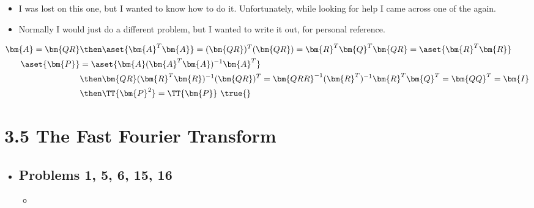 \begin{itemize}
\begin{enumerate}
    \begin{itemize}
      \item I was lost on this one, but I wanted to know how to do it.
        Unfortunately, while looking for help I came across one of the again.
      \item Normally I would just do a different problem, but I wanted to write
        it out, for personal reference.
    \end{itemize}
    \begin{align*}
      \bm{A} = \bm{QR} &\then \aset{\bm{A}^T  \bm{A}} = (\bm{QR})^T (\bm{QR}) = \bm{R}^T \bm{Q}^T \bm{QR} = \aset{\bm{R}^T \bm{R}} \\
      \aset{\bm{P}} &= \aset{\bm{A}(\bm{A}^T \bm{A})^{-1} \bm{A}^T } \\
             &\then
             \bm{QR}(\bm{R}^T \bm{R})^{-1} (\bm{QR})^T = \bm{QRR}^{-1}(\bm{R}^T )^{-1} \bm{R}^T \bm{Q}^T = \bm{QQ}^T = \bm{I} \\
             &\then \TT{\bm{P}^2} = \TT{\bm{P}}~\text{\true{}}
    \end{align*}

  \end{enumerate}
\end{itemize}

\section{3.5 The Fast Fourier Transform}
\begin{itemize}
  \item[]

  \subsection{Problems 1, 5, 6, 15, 16}
  \begin{itemize}
    \item
  \end{itemize}

\end{itemize}
